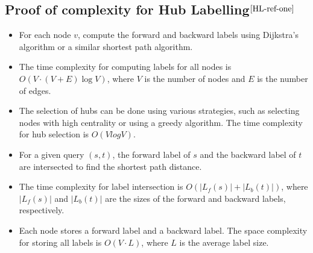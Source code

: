 \begin{appendices}
\section{Proof of complexity for Hub Labelling$^{\cite{HL-ref-one}}$}\label{appendix:Hub Labelling:Complexity}
	\begin{itemize}
		\item For each node $v$, compute the forward and backward labels using Dijkstra's algorithm or a similar shortest path algorithm.
		\item The time complexity for computing labels for all nodes is $O(V \cdot (V+E)\log V)$, where $V$ is the number of nodes and $E$ is the number of edges.
		\item The selection of hubs can be done using various strategies, such as selecting nodes with high centrality or using a greedy algorithm. The time complexity for hub selection is $O(VlogV)$.
		\item For a given query $(s,t)$, the forward label of $s$ and the backward label of $t$ are intersected to find the shortest path distance.
		\item The time complexity for label intersection is $O(|L_f(s)| + |L_b(t)|)$, where $|L_f(s)|$ and $|L_b(t)|$ are the sizes of the forward and backward labels, respectively.
		\item Each node stores a forward label and a backward label. The space complexity for storing all labels is $O(V \cdot L)$, where $L$ is the average label size.
	\end{itemize}
	
	
\end{appendices}